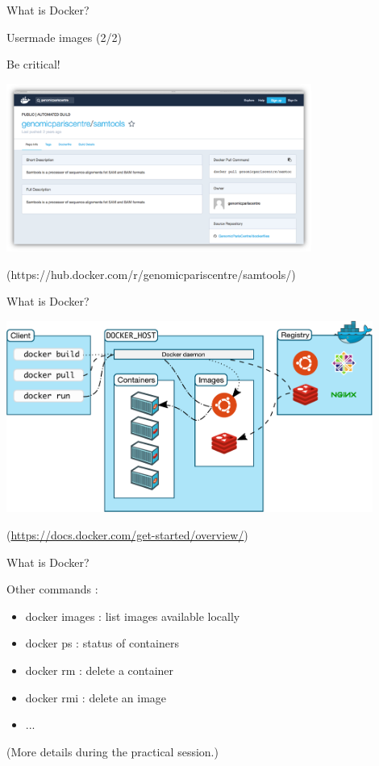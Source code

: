 \begin{frame}{What is Docker?}

Usermade images (2/2)

Be critical!

\centering\includegraphics[width=10cm]{02_encapsulation/images/docker_dockerhub_gpc_samtools.png}

(https://hub.docker.com/r/genomicpariscentre/samtools/)
\end{frame}

\begin{frame}{What is Docker?}

\centering\includegraphics[width=12cm]{02_encapsulation/images/docker_architecture.pdf}

(\url{https://docs.docker.com/get-started/overview/})
\end{frame}

\begin{frame}{What is Docker?}

Other commands :

\begin{itemize}
  \item docker images : list images available locally
  \item docker ps : status of containers
  \item docker rm : delete a container
  \item docker rmi : delete an image
  \item ...
\end{itemize}

(More details during the practical session.)

\end{frame}

